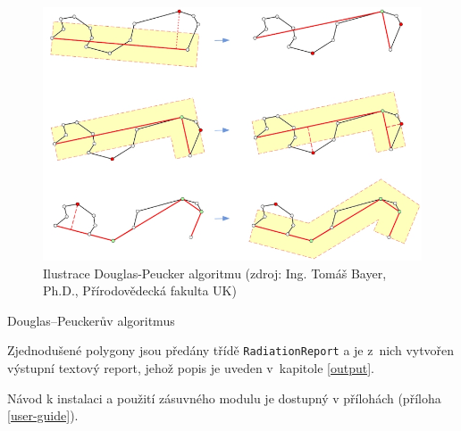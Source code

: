 \begin{figure}[H]
    \centering
      \includegraphics[width=350pt]{./pictures/DPalgoritmus.jpg}
      \caption[Ilustrace DP]{Ilustrace Douglas-Peucker algoritmu (zdroj: Ing. Tomáš Bayer, Ph.D., Přírodovědecká fakulta UK)}
      \label{fig:DPalgo}
\end{figure}	
	
\begin{algorithm}
\caption{Douglas–Peuckerův algoritmus}
\label{alg:RDP}
    \begin{algorithmic}[1] 
		\ENDIF	
	\ENDFOR
	\end{algorithmic}
\end{algorithm}	

\begin{algorithm}
    \begin{algorithmic}[1] 
	\ELSE
	\ENDIF
    \end{algorithmic}
\end{algorithm}	

\newpage

Zjednodušené polygony jsou předány třídě \texttt{RadiationReport} a 
je z~nich vytvořen výstupní textový report, jehož popis je uveden 
v~kapitole \ref{output}.

Návod k instalaci a použití zásuvného modulu je dostupný v přílohách (příloha \ref{user-guide}).